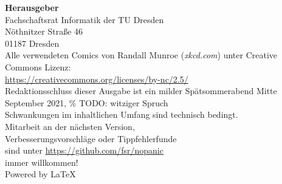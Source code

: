 \newpage
\thispagestyle{empty} %
\color{white}

\begin{minipage}[t][\textheight][b]{.65\textwidth}
\footnotesize
\textbf{Herausgeber} \\
Fachschaftsrat Informatik der TU Dresden\\
Nöthnitzer Straße 46\\
01187 Dresden\\[1\baselineskip]

Alle verwendeten Comics von Randall Munroe (\textit{xkcd.com}) unter Creative Commons Lizenz:\\
\url{https://creativecommons.org/licenses/by-nc/2.5/}\\[1\baselineskip]

Redaktionsschluss dieser Ausgabe ist ein milder Spätsommerabend Mitte September 2021, \% TODO: witziger Spruch\\%
Schwankungen im inhaltlichen Umfang sind technisch bedingt.\\[1\baselineskip]

Mitarbeit an der nächsten Version,\\
Verbesserungsvorschläge oder Tippfehlerfunde\\
sind unter \url{https://github.com/fsr/nopanic}\\
immer willkommen!\\[1\baselineskip]

Powered by \LaTeX
\end{minipage}%
\hfill%
